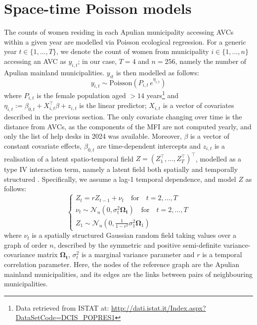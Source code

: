 \documentclass[openany, 11pt, oneside]{book}
\begin{document}
\section{Space-time Poisson models}\label{section:STPoisson}

The counts of women residing in each Apulian municipality accessing AVCs within a given year are modelled via Poisson ecological regression. For a generic year $t \in \lbrace 1, \dots, T \rbrace$, we denote the count of women from municipality $i \in \lbrace 1, \dots, n \rbrace$ accessing an AVC as $y_{i,t}$; in our case, $T=4$ and $n=256$, namely the number of Apulian mainland municipalities. $y_{it}$ is then modelled as follows:
%
$$
y_{i, t} \sim \mathrm{Poisson}(P_{i,t} \,e^{ \eta_{i,t} })
$$
%
where $P_{i,t}$ is the female population aged $>14$ years\footnote{Data retrieved from ISTAT at: \url{http://dati.istat.it/Index.aspx?DataSetCode=DCIS_POPRES1}} and $\eta_{i,t} := \beta_{0, t} +X_{i,t}^{\top}\beta + z_{i,t}$ is the linear predictor; $X_{i,t}$ is a vector of covariates described in the previous section. The only covariate changing over time is the distance from AVCs, as the components of the MFI are not computed yearly, and only the list of help desks in 2024 was available.
%
Moreover, $\beta$ is a vector of constant covariate effects, $\beta_{0,t}$ are time-dependent intercepts and $z_{i,t}$ is a realisation of a latent spatio-temporal field $Z = (Z_{1}^\top, \dots, Z_{T}^\top)^{\top}$, modelled as a type IV interaction term, namely a latent field both spatially and temporally structured \parencite{KnorrHeld}. Specifically, we assume a lag-1 temporal dependence, and model $Z$ as follows:
%
\begin{equation}\label{eq:AR1}
\left \{ \begin{array}{ll}
 Z_t = r Z_{t-1} + \nu_t  \quad \text{for} \quad t=2,\dots, T\\
\nu_t \sim \mathcal{N}_n\left(0, \sigma^2_t \boldsymbol{\boldsymbol{\Omega}_t}\right)  \quad \text{for} \quad t=2,\dots, T\\
Z_1 \sim \mathcal{N}_n \left( 0, \frac{1}{1-r^2}\sigma^2_1 \boldsymbol{\Omega}_1 \right)
\end{array} \right.
\end{equation}
%
where $\nu_t$ is a spatially structured Gaussian random field taking values over a graph of order $n$, described by the symmetric and positive semi-definite variance-covariance matrix $\boldsymbol{\boldsymbol{\Omega}_t}$, $\sigma^2_t$ is a marginal variance parameter and $r$ is a temporal correlation parameter. Here, the nodes of the reference graph are the Apulian mainland municipalities, and its edges are the links between pairs of neighbouring municipalities. 
\end{document}
